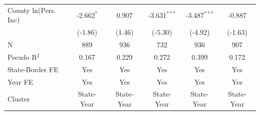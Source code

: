 \begin{tabular*}{\textwidth}{@{\extracolsep{\fill}}lccccc}
   County ln(Pers. Inc) & -2.662$^{*}$  & 0.907          & -3.631$^{***}$  & -3.487$^{***}$ & -0.887\\   
                        & (-1.86)      & (1.46)        & (-5.30)        & (-4.92)       & (-1.63)\\   
   \hline
   N         & 889           & 936            & 732             & 936            & 907\\  
   Pseudo R$^2$         & 0.167         & 0.229          & 0.272           & 0.399          & 0.172\\  
   State-Border FE      & Yes           & Yes            & Yes             & Yes            & Yes\\  
   Year FE              & Yes           & Yes            & Yes             & Yes            & Yes\\  
   Cluster              & State-Year & State-Year & State-Year & State-Year & State-Year\\  
   \bottomrule
\end{tabular*}
\par\endgroup
